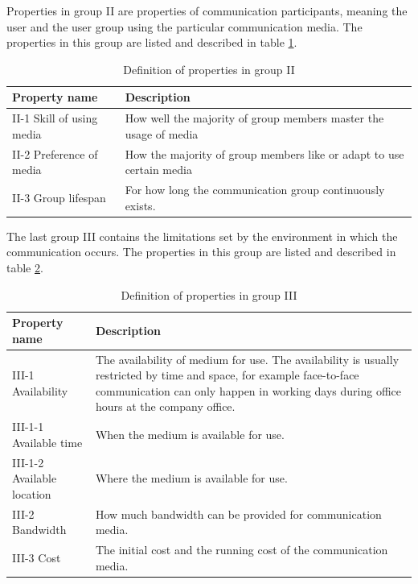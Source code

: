 \documentclass[english,12pt,a4paper,pdftex]{article}
\begin{document}
Properties in group II are properties of communication participants, meaning the user and the user group using the particular communication media. The properties in this group are listed and described in table \ref{table:mft_group2}.

\begin{table}[!h]
\renewcommand{\arraystretch}{1.3}
\caption{Definition of properties in group II}
\label{table:mft_group2}
\centering
\begin{tabular}{|p{4cm}|p{10cm}|}
\hline
\textbf{Property name} & \textbf{Description}\\
\hline
II-1 Skill of using media & How well the majority of group members master the usage of media  \\
\hline
II-2 Preference of media & How the majority of group members like or adapt to use certain media \\
\hline
II-3 Group lifespan & For how long the communication group continuously exists. \\
\hline
\end{tabular}
\end{table}

The last group III contains the limitations set by the environment in which the communication occurs. The properties in this group are listed and described in table \ref{table:mft_group3}.

\begin{table}[!h]
\renewcommand{\arraystretch}{1.3}
\caption{Definition of properties in group III}
\label{table:mft_group3}
\centering
\begin{tabular}{|p{4cm}|p{10cm}|}
\hline
\textbf{Property name} & \textbf{Description}\\
\hline
III-1 Availability & The availability of medium for use. The availability is usually restricted by time and space, for example face-to-face communication can only happen in working days during office hours at the company office. \\
\hline
III-1-1 Available time & When the medium is available for use. \\
\hline
III-1-2 Available location & Where the medium is available for use. \\
\hline
III-2 Bandwidth & How much bandwidth can be provided for communication media. \\
\hline
III-3 Cost & The initial cost and the running cost of the communication media. \\
\hline
\end{tabular}
\end{table}
\end{document}

